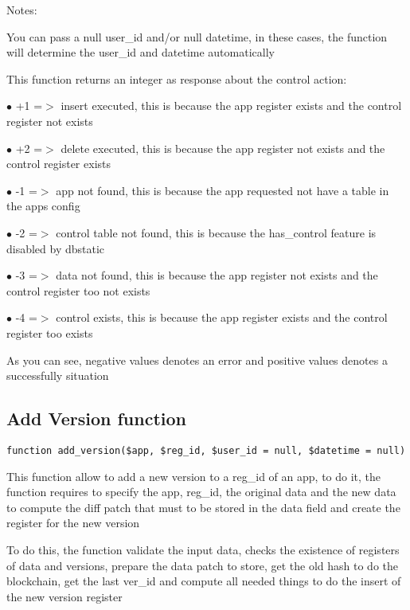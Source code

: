 \documentclass[a4paper]{book}
\begin{document}
Notes:

You can pass a null user\_id and/or null datetime, in these cases, the
function will determine the user\_id and datetime automatically

This function returns an integer as response about the control action:

\begin{compactitem}
\item[\color{myblue}$\bullet$] +1 =$>$ insert executed, this is because the app register exists and the control register not exists
\item[\color{myblue}$\bullet$] +2 =$>$ delete executed, this is because the app register not exists and the control register exists
\item[\color{myblue}$\bullet$] -1 =$>$ app not found, this is because the app requested not have a table in the apps config
\item[\color{myblue}$\bullet$] -2 =$>$ control table not found, this is because the has\_control feature is disabled by dbstatic
\item[\color{myblue}$\bullet$] -3 =$>$ data not found, this is because the app register not exists and the control register too not exists
\item[\color{myblue}$\bullet$] -4 =$>$ control exists, this is because the app register exists and the control register too exists
\end{compactitem}

As you can see, negative values denotes an error and positive values denotes a successfully situation

\hypertarget{toc60}{}
\subsection{Add Version function}

\begin{lstlisting}
function add_version($app, $reg_id, $user_id = null, $datetime = null)
\end{lstlisting}

This function allow to add a new version to a reg\_id of an app, to do it,
the function requires to specify the app, reg\_id, the original data and
the new data to compute the diff patch that must to be stored in the data
field and create the register for the new version

To do this, the function validate the input data, checks the existence
of registers of data and versions, prepare the data patch to store, get
the old hash to do the blockchain, get the last ver\_id and compute all
needed things to do the insert of the new version register
\end{document}
